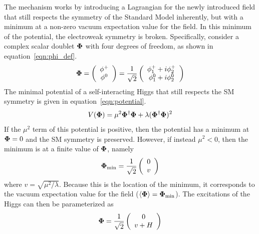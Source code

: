 The mechanism works by introducing a Lagrangian for the newly introduced field that still respects the symmetry of the Standard Model inherently, but with a minimum at a non-zero vacuum expectation value for the field. In this minimum of the potential, the electroweak symmetry is broken. Specifically, consider a complex scalar doublet $\mathbf{\Phi}$ with four degrees of freedom, as shown in equation~\ref{eqn:phi_def}.
%
\begin{equation}
\label{eqn:phi_def}
\mathbf{\Phi} = \left( \begin{array}{c} \phi^+ \\ \phi^0 \end{array} \right) = \frac{1}{\sqrt{2}}\left( \begin{array}{c} \phi_{1}^{+} + i\phi_{2}^+ \\ \phi_1^0 + i\phi_2^0 \end{array} \right)
\end{equation}
%
The minimal potential of a self-interacting Higgs that still respects the SM symmetry is given in equation~\ref{eqn:potential}.
%
\begin{equation}
\label{eqn:potential}
V(\mathbf{\Phi}) = \mu^2 \mathbf{\Phi}^{\dagger}\mathbf{\Phi} + \lambda(\mathbf{\Phi}^\dagger\mathbf{\Phi})^2
\end{equation}
%
If the $\mu^2$ term of this potential is positive, then the potential has a minimum at $\mathbf{\Phi} = 0$ and the SM symmetry is preserved. However, if instead $\mu^2 < 0$, then the minimum is at a finite value of $\mathbf{\Phi}$, namely
%
\begin{equation}
\mathbf{\Phi}_{\rm min} = \frac{1}{\sqrt{2}} \left(\begin{array}{c} 0 \\ v\end{array} \right)
\end{equation}
%
where $v = \sqrt{\mu^2/\lambda}$. Because this is the location of the minimum, it corresponds to the vacuum expectation value for the field ($\langle\mathbf{\Phi}\rangle = \mathbf{\Phi}_{\rm min}$). The excitations of the Higgs can then be parameterized as 
%
\begin{equation}
\mathbf{\Phi} = \frac{1}{\sqrt{2}} \left(\begin{array}{c} 0 \\ v + H \end{array}\right)
\end{equation}
